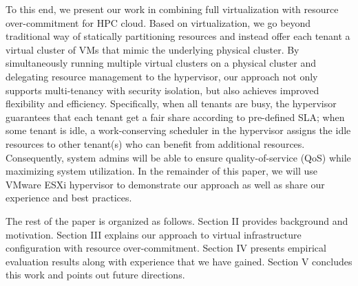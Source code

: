 To this end, we present our work in combining full virtualization with resource over-commitment for  HPC cloud.
Based on virtualization, we go beyond traditional way of 
statically partitioning resources and instead offer each tenant a virtual 
cluster of VMs that mimic the underlying physical cluster. By simultaneously running 
multiple virtual clusters on a physical cluster and delegating resource management  
to the hypervisor, our approach not only supports 
multi-tenancy with security isolation, but also achieves improved flexibility and efficiency. Specifically, when all tenants are busy, 
the hypervisor guarantees that each tenant get a fair share according to pre-defined SLA; when 
some tenant is idle, a work-conserving scheduler in the hypervisor assigns the idle resources to other tenant(s) who can benefit 
from additional resources. Consequently, system admins will be able to ensure quality-of-service (QoS) while maximizing system utilization. In the remainder of this paper, we will use VMware ESXi hypervisor to demonstrate our approach as well as share our experience and best practices. 

The rest of the paper is organized as follows. 
Section II provides background and motivation. Section III explains our approach to virtual infrastructure configuration with resource over-commitment. Section IV presents empirical evaluation results along with experience that we have gained. Section V concludes this work and points out future directions.
